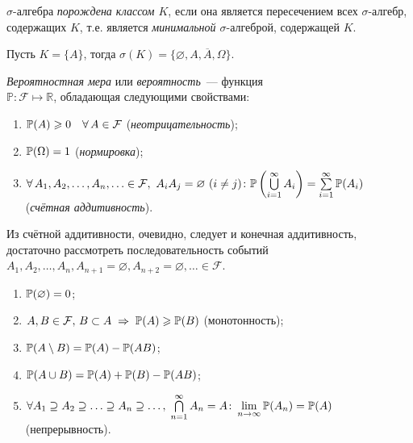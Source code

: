 \hypertarget{generated_sigma}{}
\begin{defn}
    $\sigma \text{-алгебра}$ \textit{порождена классом $K$}, если она является пересечением всех $\sigma \text{-алгебр}$, содержащих $K$, т.е. является \textit{минимальной $\sigma \text{-алгеброй}$}, содержащей $K$.
\end{defn}

\begin{exmp}
    Пусть $K = \{A\}$, тогда $\sigma (K) = \{\varnothing, A, \overline{A}, \Omega\}$.
\end{exmp}

\begin{defn}
    \textit{Вероятностная мера} или \textit{вероятность}~--- функция \\
    ${\mathbb{P}\colon \mathcal{F} \mapsto \mathbb{R}}$, обладающая следующими свойствами:

\begin{enumerate}
    \item 
        ${\mathbb{P}(A)} \geqslant 0 \quad \forall \, A \in \mathcal{F}$ (\textit{неотрицательность});
    \item 
        ${\mathbb{P}(\Omega)} = 1$ (\textit{нормировка});
    \item 
        $\forall \, A_1, A_2, \ldots, A_n, \ldots \in \mathcal{F},~ A_{i}A_{j} = \varnothing~ (i \ne j) \colon \mathbb{P}\left( \bigcup\limits_{i=1}^\infty A_i \right) = \sum\limits_{i=1}^\infty {\mathbb{P}(A_i)}$ \\
        (\textit{счётная аддитивность}).
\end{enumerate}
\end{defn}

\begin{rmrk}
    Из счётной аддитивности, очевидно, следует и конечная аддитивность, достаточно рассмотреть последовательность событий $A_1, A_2, \ldots, A_n, A_{n+1}=\varnothing, A_{n+2}=\varnothing,\ldots \in \mathcal{F}$.
\end{rmrk}
\pagebreak
\begin{namedthm}\leavevmode
    \begin{enumerate}
        \item 
            ${\mathbb{P}(\varnothing)}=0$;
        \item 
            $A, B \in \mathcal{F}, \, B \subset A \; \Rightarrow \; {\mathbb{P}(A)} \geqslant {\mathbb{P}(B)}$ (монотонность);
        \item 
            ${\mathbb{P}(A \setminus B)} = {\mathbb{P}(A)} - {\mathbb{P}(AB)}$;
        \item 
            ${\mathbb{P}(A \cup B)} = {\mathbb{P}(A)} + {\mathbb{P}(B)} - {\mathbb{P}(AB)}$;
        \item 
            $\forall A_1 \supseteq A_2 \supseteq \ldots \supseteq A_n \supseteq \ldots, \; \bigcap\limits_{n = 1}^{\infty} A_n = A \colon \lim\limits_{n \to \infty}{\mathbb{P}(A_n)} = {\mathbb{P}(A)}$ \\
            (непрерывность).
    \end{enumerate}
\end{namedthm}

